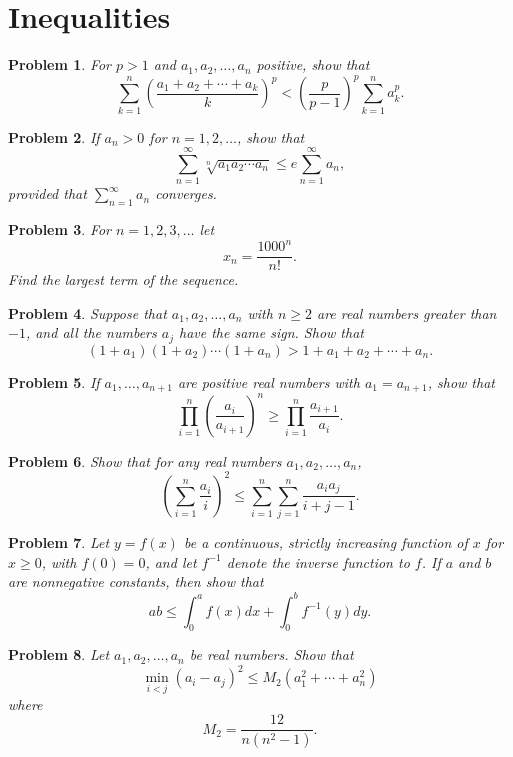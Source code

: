 \documentclass[12pt]{article}
\newtheorem{problem}{Problem}
\begin{document}
\section*{Inequalities}

\begin{problem}
For $p > 1$ and $a_1, a_2, \ldots, a_n$ positive, show that
\[
\sum_{k=1}^{n} \left( \frac{a_1 + a_2 + \cdots + a_k}{k} \right)^p
< \left( \frac{p}{p-1} \right)^p \sum_{k=1}^n a_k^p.
\]
\end{problem}

\begin{problem}
If $a_n > 0$ for $n = 1, 2, \ldots$, show that
\[
\sum_{n=1}^{\infty} \sqrt[n]{a_1 a_2 \cdots a_n} \leq e \sum_{n=1}^{\infty} a_n,
\]
provided that $\sum_{n=1}^{\infty} a_n$ converges.
\end{problem}

\begin{problem}
For $n = 1, 2, 3, \ldots$ let
\[
x_n = \frac{1000^n}{n!}.
\]
Find the largest term of the sequence.
\end{problem}

\begin{problem}
Suppose that $a_1, a_2, \ldots, a_n$ with $n \geq 2$ are real numbers greater than $-1$, and all the numbers $a_j$ have the same sign. Show that
\[
(1 + a_1)(1 + a_2) \cdots (1 + a_n) > 1 + a_1 + a_2 + \cdots + a_n.
\]
\end{problem}

\begin{problem}
If $a_1, \ldots, a_{n+1}$ are positive real numbers with $a_1 = a_{n+1}$, show that
\[
\prod_{i=1}^n \left(\frac{a_i}{a_{i+1}}\right)^n \geq \prod_{i=1}^n \frac{a_{i+1}}{a_i}.
\]
\end{problem}

\begin{problem}
Show that for any real numbers $a_1, a_2, \ldots, a_n$,
\[
\left(\sum_{i=1}^n \frac{a_i}{i}\right)^2
\leq
\sum_{i=1}^n \sum_{j=1}^n \frac{a_i a_j}{i + j - 1}.
\]
\end{problem}

\begin{problem}
Let $y = f(x)$ be a continuous, strictly increasing function of $x$ for $x \geq 0$, with $f(0) = 0$, and let $f^{-1}$ denote the inverse function to $f$. If $a$ and $b$ are nonnegative constants, then show that
\[
ab \leq \int_0^a f(x) dx + \int_0^b f^{-1}(y) dy.
\]
\end{problem}

\begin{problem}
\textbf{\textcolor{red}{\heart}}
Let $a_1, a_2, \ldots, a_n$ be real numbers. Show that
\[
\min_{i<j} (a_i - a_j)^2
\leq M_2 \left(
a_1^2 + \cdots + a_n^2
\right)
\]
where
\[
M_2 =
\frac{12}{n(n^2-1)}.
\]
\end{problem}
\end{document}
